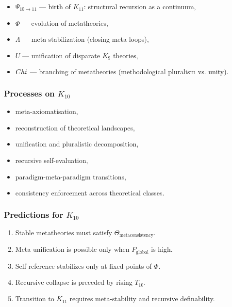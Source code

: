 \begin{itemize}
    \item $\Psi_{10\to11}$ — birth of $K_{11}$: structural recursion as a continuum,
    \item $\Phi$ — evolution of metatheories,
    \item $\Lambda$ — meta-stabilization (closing meta-loops),
    \item $U$ — unification of disparate $K_9$ theories,
    \item $Chi$ — branching of metatheories (methodological pluralism vs. unity).
\end{itemize}

\subsubsection{Processes on $K_{10}$}

\begin{itemize}
    \item meta-axiomatisation,
    \item reconstruction of theoretical landscapes,
    \item unification and pluralistic decomposition,
    \item recursive self-evaluation,
    \item paradigm-meta-paradigm transitions,
    \item consistency enforcement across theoretical classes.
\end{itemize}

\subsubsection{Predictions for $K_{10}$}

\begin{enumerate}
    \item Stable metatheories must satisfy $\Theta_{\mathrm{metaconsistency}}$.
    \item Meta-unification is possible only when $P_{\mathrm{global}}$ is high.
    \item Self-reference stabilizes only at fixed points of $\Phi$.
    \item Recursive collapse is preceded by rising $T_{10}$.
    \item Transition to $K_{11}$ requires meta-stability and recursive definability.
\end{enumerate}

